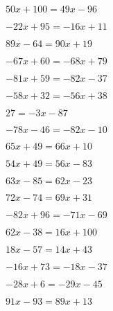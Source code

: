 \item $50x+100 = 49x-96$
\item $-22x+95 = -16x+11$
\item $89x-64 = 90x+19$
\item $-67x+60 = -68x+79$
\item $-81x+59 = -82x-37$
\item $-58x+32 = -56x+38$
\item $27 = -3x-87$
\item $-78x-46 = -82x-10$
\item $65x+49 = 66x+10$
\item $54x+49 = 56x-83$
\item $63x-85 = 62x-23$
\item $72x-74 = 69x+31$
\item $-82x+96 = -71x-69$
\item $62x-38 = 16x+100$
\item $18x-57 = 14x+43$
\item $-16x+73 = -18x-37$
\item $-28x+6 = -29x-45$
\item $91x-93 = 89x+13$
